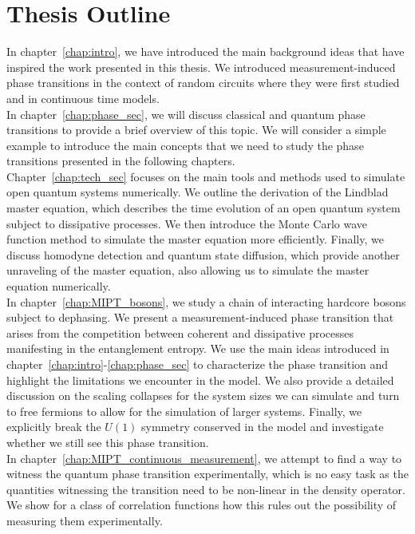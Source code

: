\section{Thesis Outline}

In chapter~\ref{chap:intro}, we have introduced the main background ideas that have inspired the work presented in this thesis. We introduced measurement-induced phase transitions in the context of random circuits where they were first studied and in continuous time models. \\

In chapter~\ref{chap:phase_sec}, we will discuss classical and quantum phase transitions to provide a brief overview of this topic. We will consider a simple example to introduce the main concepts that we need to study the phase transitions presented in the following chapters. \\

Chapter~\ref{chap:tech_sec} focuses on the main tools and methods used to simulate open quantum systems numerically. We outline the derivation of the Lindblad master equation, which describes the time evolution of an open quantum system subject to dissipative processes. We then introduce the Monte Carlo wave function method to simulate the master equation more efficiently. Finally, we discuss homodyne detection and quantum state diffusion, which provide another unraveling of the master equation, also allowing us to simulate the master equation numerically.  \\

In chapter~\ref{chap:MIPT_bosons}, we study a chain of interacting hardcore bosons subject to dephasing. We present a measurement-induced phase transition that arises from the competition between coherent and dissipative processes manifesting in the entanglement entropy. We use the main ideas introduced in chapter~\ref{chap:intro}-\ref{chap:phase_sec} to characterize the phase transition and highlight the limitations we encounter in the model. We also provide a detailed discussion on the scaling collapses for the system sizes we can simulate and turn to free fermions to allow for the simulation of larger systems. Finally, we explicitly break the $U(1)$ symmetry conserved in the model and investigate whether we still see this phase transition. \\

In chapter~\ref{chap:MIPT_continuous_measurement}, we attempt to find a way to witness the quantum phase transition experimentally, which is no easy task as the quantities witnessing the transition need to be non-linear in the density operator. We show for a class of correlation functions how this rules out the possibility of measuring them experimentally. \\

